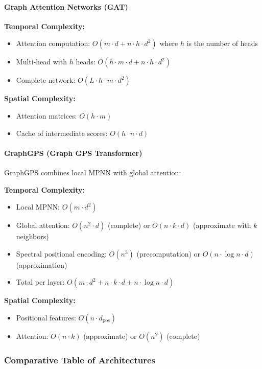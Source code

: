 \paragraph{Graph Attention Networks (GAT)}

\textbf{Temporal Complexity:}
\begin{itemize}
\item Attention computation: $O(m \cdot d + n \cdot h \cdot d^2)$ where $h$ is the number of heads
\item Multi-head with $h$ heads: $O(h \cdot m \cdot d + n \cdot h \cdot d^2)$
\item Complete network: $O(L \cdot h \cdot m \cdot d^2)$
\end{itemize}

\textbf{Spatial Complexity:}
\begin{itemize}
\item Attention matrices: $O(h \cdot m)$
\item Cache of intermediate scores: $O(h \cdot n \cdot d)$
\end{itemize}

\paragraph{GraphGPS (Graph GPS Transformer)}

GraphGPS combines local \gls{MPNN} with global attention:

\textbf{Temporal Complexity:}
\begin{itemize}
\item Local \gls{MPNN}: $O(m \cdot d^2)$
\item Global attention: $O(n^2 \cdot d)$ (complete) or $O(n \cdot k \cdot d)$ (approximate with $k$ neighbors)
\item Spectral positional encoding: $O(n^3)$ (precomputation) or $O(n \cdot \log n \cdot d)$ (approximation)
\item Total per layer: $O(m \cdot d^2 + n \cdot k \cdot d + n \cdot \log n \cdot d)$
\end{itemize}

\textbf{Spatial Complexity:}
\begin{itemize}
\item Positional features: $O(n \cdot d_{\text{pos}})$
\item Attention: $O(n \cdot k)$ (approximate) or $O(n^2)$ (complete)
\end{itemize}

\subsubsection{Comparative Table of Architectures}

